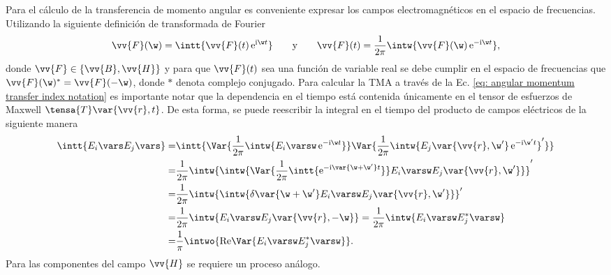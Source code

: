 Para el cálculo de la transferencia de momento angular es conveniente expresar los campos electromagnéticos en el espacio de frecuencias. Utilizando la siguiente definición de transformada de Fourier
\begin{equation}
\vv{F}(\w) = \intt{\vv{F}(t)\,{\rm e}^{{\rm i} \w t}} \qquad \text{y} \qquad \vv{F}(t) = \frac{1}{2\pi}\intw{\vv{F}(\w)\,{\rm e}^{-{\rm i} \w t}},
\end{equation}
donde $\vv{F}\in \{ \vv{B}, \vv{H}\}$ y para que $\vv{F}(t)$ sea una función de variable real se debe cumplir en el espacio de frecuencias que $\vv{F}(\w)^{*}=\vv{F}(-\w)$, donde $*$ denota complejo conjugado. Para calcular la TMA a través de la Ec. \eqref{eq: angular momentum transfer index notation} es importante notar que la dependencia en el tiempo está contenida únicamente en el tensor de esfuerzos de Maxwell $\tensa{T}\var{\vv{r},t}$. De esta forma, se puede reescribir la integral en el tiempo del producto de campos eléctricos de la siguiente manera
\begin{align}
\intt{E_i\vars E_j \vars} =& \intt{\Var{\frac{1}{2\pi}\intw{E_i\varsw \,{\rm e}^{-{\rm i} \w t} }} \Var{\frac{1}{2\pi}\intw{E_j\var{\vv{r},\w^{\prime}} \,{\rm e}^{-{\rm i} \w^{\prime} t} }^{\prime}} } \nonumber\\
=&\frac{1}{2\pi} \intw{\intw{\Var{\frac{1}{2\pi}\intt{{\rm e}^{-{\rm i}\var{\w+\w^{\prime}} t}}} E_i \varsw E_j\var{\vv{r},\w^{\prime}}}}^{\prime} \nonumber\\
=&\frac{1}{2\pi}\intw{\intw{\delta\var{\w+\w^{\prime}} E_i \varsw E_j\var{\vv{r},\w^{\prime}} }}^{\prime} \nonumber\\
=&\frac{1}{2\pi}\intw{ E_i \varsw E_j\var{\vv{r},-\w} }=\frac{1}{2\pi}\intw{ E_i \varsw E_j^{*}\varsw } \nonumber\\
=&\frac{1}{\pi}\intwo{{\rm Re}\Var{E_i\varsw E_j^{*}\varsw}}.
\end{align}
Para las componentes del campo $\vv{H}$ se requiere un proceso análogo.

